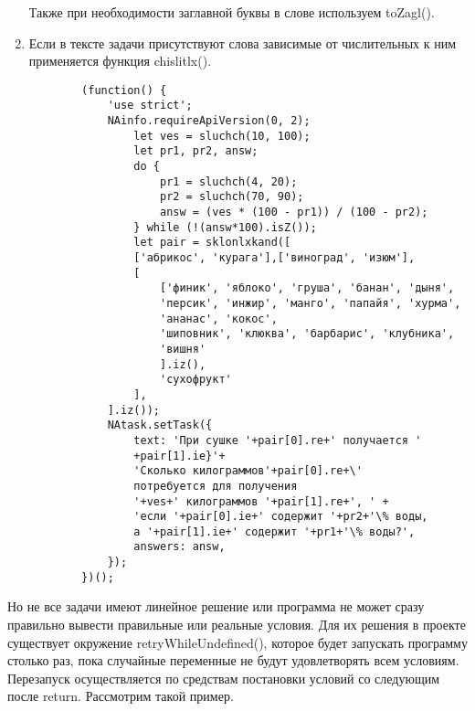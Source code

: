 \begin{enumerate}
          Также при необходимости заглавной буквы в слове используем toZagl().
    \item Если в тексте задачи присутствуют слова зависимые от числительных к ним применяется функция chislitlx().
          \begin{verbatim}
        (function() {
            'use strict';
            NAinfo.requireApiVersion(0, 2);
                let ves = sluchch(10, 100);
                let pr1, pr2, answ;
                do {
                    pr1 = sluchch(4, 20);
                    pr2 = sluchch(70, 90);
                    answ = (ves * (100 - pr1)) / (100 - pr2);
                } while (!(answ*100).isZ());
                let pair = sklonlxkand([
                ['абрикос', 'курага'],['виноград', 'изюм'],
                [
                    ['финик', 'яблоко', 'груша', 'банан', 'дыня',
                    'персик', 'инжир', 'манго', 'папайя', 'хурма',
                    'ананас', 'кокос',
                    'шиповник', 'клюква', 'барбарис', 'клубника',
                    'вишня'
                    ].iz(),
                    'сухофрукт'
                ],
            ].iz());
            NAtask.setTask({
                text: 'При сушке '+pair[0].re+' получается '
                +pair[1].ie}'+
                'Сколько килограммов'+pair[0].re+\'
                потребуется для получения 
                '+ves+' килограммов '+pair[1].re+', ' +
                'если '+pair[0].ie+' содержит '+pr2+'\% воды, 
                а '+pair[1].ie+' содержит '+pr1+'\% воды?',
                answers: answ,
            });
        })();
        \end{verbatim}
\end{enumerate}
Но не все задачи имеют линейное решение или программа не может сразу правильно вывести правильные или реальные условия.
Для их решения в проекте существует окружение retryWhileUndefined(), которое будет запускать программу столько раз, пока случайные переменные не будут удовлетворять всем условиям.
Перезапуск осуществляется по средствам постановки условий со следующим после return.
Рассмотрим такой пример.


